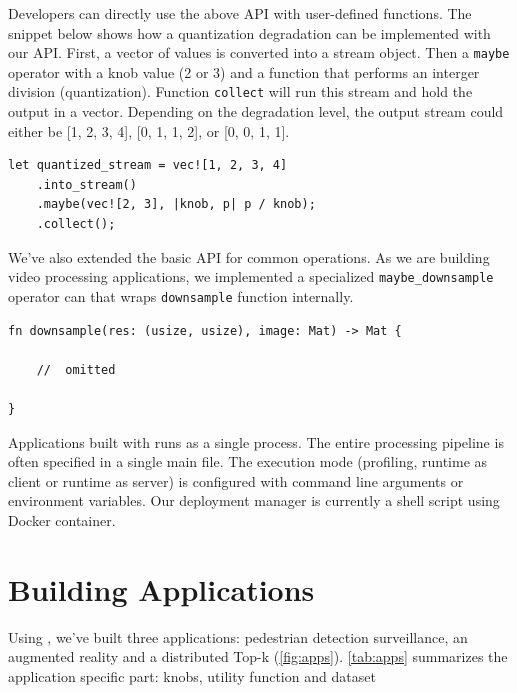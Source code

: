 Developers can directly use the above API with user-defined functions. The
snippet below shows how a quantization degradation can be implemented with our
API. First, a vector of values is converted into a stream object. Then a
\texttt{maybe} operator with a knob value (2 or 3) and a function that performs
an interger division (quantization). Function \texttt{collect} will run this
stream and hold the output in a vector. Depending on the degradation level, the
output stream could either be [1, 2, 3, 4], [0, 1, 1, 2], or [0, 0, 1, 1].

\begin{lstlisting}
let quantized_stream = vec![1, 2, 3, 4]
    .into_stream()
    .maybe(vec![2, 3], |knob, p| p / knob);
    .collect();
\end{lstlisting}

We've also extended the basic API for common operations. As we are building
video processing applications, we implemented a specialized
\texttt{maybe\_downsample} operator can that wraps \texttt{downsample} function
internally.

\begin{lstlisting}
fn downsample(res: (usize, usize), image: Mat) -> Mat {

    //  omitted

}
\end{lstlisting}

Applications built with \sysname{} runs as a single process. The entire
processing pipeline is often specified in a single main file. The execution mode
(profiling, runtime as client or runtime as server) is configured with command
line arguments or environment variables. Our deployment manager is currently a
shell script using Docker container.

\section{Building \sysname{} Applications}
\label{sec:build-appl}

Using \sysname{}, we've built three applications: pedestrian detection
surveillance, an augmented reality and a distributed Top-k (\autoref{fig:apps}).
\autoref{tab:apps} summarizes the application specific part: knobs, utility
function and dataset

